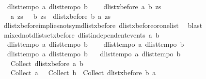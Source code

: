\begin{isabellebody}
\ \ {\isasymlbrakk}dlist{\isacharunderscore}tempo{}\ a{\isacharsemicolon}\ dlist{\isacharunderscore}tempo{}\ b{\isasymrbrakk}\ {\isasymLongrightarrow}\isanewline
\ \ {\isacharparenleft}{\isasymnot}\ {\isacharparenleft}dlist{\isacharunderscore}xbefore\ a\ b\ zs{\isacharparenright}{\isacharparenright}\ {\isacharequal}\ \isanewline
\ \ {\isacharparenleft}{\isacharparenleft}{\isasymnot}\ a\ zs{\isacharparenright}\ {\isasymor}\ {\isacharparenleft}{\isasymnot}\ b\ zs{\isacharparenright}\ {\isasymor}\ {\isacharparenleft}dlist{\isacharunderscore}xbefore\ b\ a\ zs{\isacharparenright}{\isacharparenright}{\isachardoublequoteclose}\isanewline
%
\isadelimproof
%
\endisadelimproof
%
\isatagproof
{}\isamarkupfalse%
\ dlist{\isacharunderscore}xbefore{\isacharunderscore}implies{\isacharunderscore}not{\isacharunderscore}sym{\isacharunderscore}dlist{\isacharunderscore}xbefore\ dlist{\isacharunderscore}xbefore{\isacharunderscore}or{\isacharunderscore}one{\isacharunderscore}list\ \isanewline
{}\isamarkupfalse%
\ blast%
\endisatagproof
{\isafoldproof}%
%
\isadelimproof
\isanewline
%
\endisadelimproof
\isanewline
{}\isamarkupfalse%
\ mixed{\isacharunderscore}not{\isacharunderscore}dlistset{\isacharunderscore}xbefore{\isacharcolon}\ {\isachardoublequoteopen}dlist{\isacharunderscore}independent{\isacharunderscore}events\ a\ b\ {\isasymLongrightarrow}\ \isanewline
\ \ {\isasymlbrakk}dlist{\isacharunderscore}tempo{}\ a{\isacharsemicolon}\ dlist{\isacharunderscore}tempo{}\ b{\isasymrbrakk}\ {\isasymLongrightarrow}\ \isanewline
\ \ {\isasymlbrakk}dlist{\isacharunderscore}tempo{}\ a{\isacharsemicolon}\ dlist{\isacharunderscore}tempo{}\ b{\isasymrbrakk}\ {\isasymLongrightarrow}\isanewline
\ \ {\isasymlbrakk}dlist{\isacharunderscore}tempo{}\ a{\isacharsemicolon}\ dlist{\isacharunderscore}tempo{}\ b{\isasymrbrakk}\ {\isasymLongrightarrow}\isanewline
\ \ {\isasymlbrakk}dlist{\isacharunderscore}tempo{}\ a{\isacharsemicolon}\ dlist{\isacharunderscore}tempo{}\ b{\isasymrbrakk}\ {\isasymLongrightarrow}\isanewline
\ \ {\isacharparenleft}{\isacharminus}\ Collect\ {\isacharparenleft}dlist{\isacharunderscore}xbefore\ a\ b{\isacharparenright}{\isacharparenright}\ {\isacharequal}\ \isanewline
\ \ {\isacharparenleft}{\isacharparenleft}{\isacharminus}\ Collect\ a{\isacharparenright}\ {\isasymunion}\ {\isacharparenleft}{\isacharminus}\ Collect\ b{\isacharparenright}\ {\isasymunion}\ Collect\ {\isacharparenleft}dlist{\isacharunderscore}xbefore\ b\ a{\isacharparenright}{\isacharparenright}{\isachardoublequoteclose}\isanewline

\end{isabellebody}
